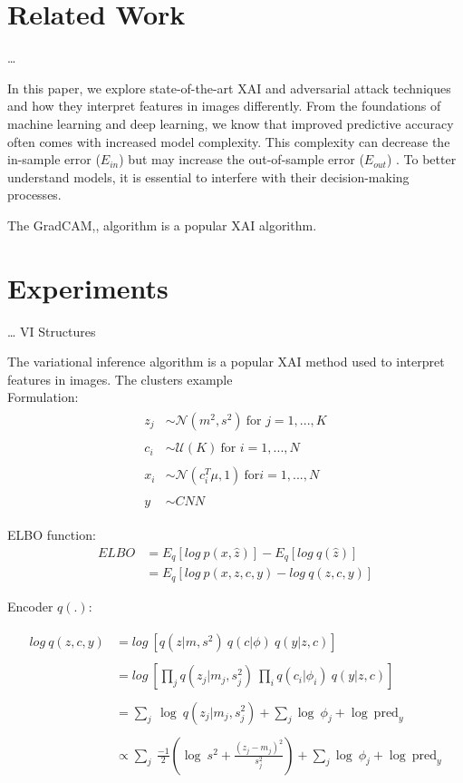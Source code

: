 \documentclass[12pt]{article}
\begin{document}
\section{Related Work}
\ldots

In this paper, we explore state-of-the-art XAI and adversarial attack techniques and how they interpret features in images differently. 
From the foundations of machine learning and deep learning, we know that improved predictive accuracy often comes with increased model complexity. 
This complexity can decrease the in-sample error ($E_{in}$) but may increase the out-of-sample error ($E_{out}$) \cite{Shalev-Shwartz2014, Devroye1996, Hastie2017}. 
To better understand models, it is essential to interfere with their decision-making processes.

The GradCAM,\cite{selvarajuGradCAMVisualExplanations2020}, algorithm is a popular XAI algorithm. 
\section{Experiments}
\ldots
VI Structures 

The variational inference algorithm is a popular XAI method used to interpret features in images.
The clusters example\cite{bleiVariationalInferenceReview2017} \\

Formulation:
\begin{align} 
  \begin{split}
z_j & \sim \mathcal{N}(m^2, s^2)~\text{for } j = 1, ..., K \\\\
c_i & \sim \mathcal{U}(K)~\text{for } i = 1, ..., N \\\\ 
x_i & \sim \mathcal{N}(c_i^T \mu, 1)~\text{for} i = 1, ..., N \\\\
y  & \sim CNN
  \end{split}
\end{align}

ELBO function:
\begin{align}
ELBO & = E_q[log~p(x,\hat{z})] - E_q[log~q(\hat{z})]\\
 &= E_q[log~p(x,z,c,y) - log~q(z,c,y)]
\end{align}

Encoder $q(.)$:


\begin{align}
  \begin{split}
log~ q(z,c,y) &= log~[q(z|m, s^2)~q(c| \phi)~q(y|z,c)] \\\\
 &= log~\left[ \prod_j q(z_{j}| m_j, s_j^2)~\prod_i q(c_i| \phi_i)~q(y| z,c) \right]\\\\
&= \sum_{j}~\log~q(z_{j}| m_j, s_j^2) +  \sum_{j} \log~ \phi_{j} + \log~ \text{pred}_{y} \\ \\
&\propto \sum_{j}~ \frac{-1}{2}\left( \log~s^2 + \frac{(z_{j}-m_{j})^2}{s_{j}^2} \right)+\sum_{j} \log~ \phi_{j} + \log~ \text{pred}_{y}
  \end{split}
\end{align}
\end{document}

